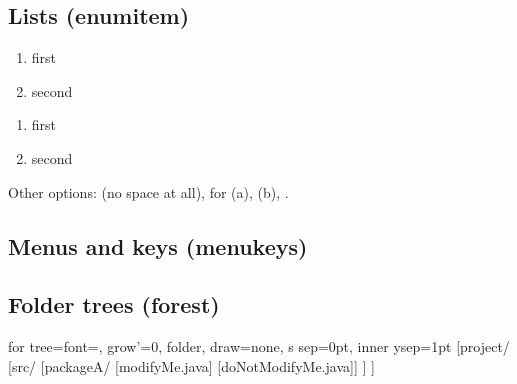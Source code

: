 \documentclass[11pt]{amsart}         %
\begin{document}
\subsection{Lists (enumitem)}

\begin{texcode}
\begin{enumerate}[label=\roman*., itemsep=0pt]   %
	\item first
	\item second
\end{enumerate}
\end{texcode}

\begin{enumerate}[label=\roman*., itemsep=0pt]
	\item first
	\item second
\end{enumerate}

Other options: \hCode{[nosep]} (no space at all), \hCode{[label=(\textbackslash alph*)]} for (a), (b),
\hCode{[topsep=1pt]}.


\subsection{Menus and keys (menukeys)}

\begin{texcode}
        
\end{texcode}

 \quad {} \quad {}


\subsection{Folder trees (forest)}

\begin{texcode}
\begin{forest}
for tree={font=\ttfamily\small, grow'=0, folder, draw=none,
          s sep=0pt, inner ysep=1pt}            %
	[project/
		[src/
			[packageA/ [modifyMe.java] [doNotModifyMe.java]]
		]
	]
\end{forest}
\end{texcode}
\end{document}
